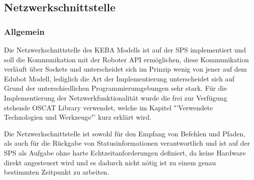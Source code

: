 \subsection{Netzwerkschnittstelle}
\subsubsection{Allgemein}
Die Netzwerkschnittstelle des KEBA Modells ist auf der SPS implementiert und soll die Kommunikation mit der Roboter API ermöglichen, diese Kommunikation verläuft über Sockets und unterscheidet sich im Prinzip wenig von jener auf dem Edubot Modell, lediglich die Art der Implementierung unterscheidet sich auf Grund der unterschiedlichen Programmierumgebungen sehr stark. Für die Implementierung der Netzwerkfunktionalität wurde die frei zur Verfügung stehende OSCAT Library verwendet, welche im Kapitel "'Verwendete Technologien und Werkzeuge"' kurz erklärt wird. 

Die Netzwerkschnittstelle ist sowohl für den Empfang von Befehlen und Pfaden, als auch für die Rückgabe von Statusinformationen verantwortlich und ist auf der SPS als Aufgabe ohne harte Echtzeitanforderungen definiert, da keine Hardware direkt angesteuert wird und es dadurch nicht nötig ist zu einem genau bestimmten Zeitpunkt zu arbeiten.

